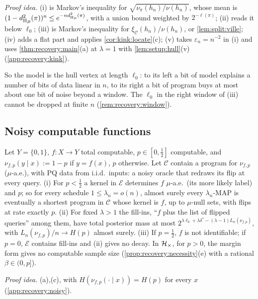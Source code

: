 \emph{Proof idea.} (i) is Markov's inequality for $\sqrt{\nu_\pi(h_n)/\nu(h_n)}$, whose mean is $(1-{d_{\mathrm{H}}^{2}}_\mu(\pi))^n\le e^{-n{d_{\mathrm{H}}^{2}}_\mu(\pi)}$, with a union bound weighted by $2^{-\ell(\pi)}$; (ii) reads it below $\ell_0$; (iii) is Markov's inequality for $\xi_{\mathcal C}(h_n)/\nu(h_n)$, or \cref{lem:split:ville}; (iv) adds a flat part and applies \cref{cor:kink:locate}(c); (v) takes $\varepsilon_n=n^{-2}$ in (i) and uses \cref{thm:recovery:main}(a) at $\lambda=1$ with \cref{lem:setup:hull}(v) (\cref{app:recovery:kink}).

So the model is the hull vertex at length $\ell_0$: to its left a bit of model explains a number of bits of data linear in $n$, to its right a bit of program buys at most about one bit of noise beyond a window. The $\ell_0$ in the right window of (iii) cannot be dropped at finite $n$ (\cref{rem:recovery:window}).

\subsection{Noisy computable functions}\label{sec:recovery:noisy}

\begin{corollary}\label{cor:recovery:noisy}
Let $Y=\{0,1\}$, $f:X\to Y$ total computable, $p\in[0,\frac12]$ computable, and $\nu_{f,p}(y\mid x):=1-p$ if $y=f(x)$, $p$ otherwise. Let $\mathcal C$ contain a program for $\nu_{f,p}$ ($\mu$-a.e.), with PQ data from i.i.d.\ inputs: a noisy oracle that redraws its flip at every query.
(i) For $p<\frac12$ a kernel in $\mathcal E$ determines $f$ $\mu$-a.e.\ (its more likely label) and $p$; so for every schedule $1\le\lambda_n=o(n)$, almost surely every $\lambda_n$-MAP is eventually a shortest program in $\mathcal C$ whose kernel is $f$, up to $\mu$-null sets, with flips at rate exactly $p$.
(ii) For fixed $\lambda>1$ the fill-ins, ``$f$ plus the list of flipped queries'' among them, have total posterior mass at most $2^{\lambda\ell_0+\lambda\delta^*-(\lambda-1)L_n(\nu_{f,p})}$, with $L_n(\nu_{f,p})/n\to H(p)$ almost surely.
(iii) If $p=\frac12$, $f$ is not identifiable; if $p=0$, $\mathcal E$ contains fill-ins and (ii) gives no decay. In $\mathcal{H}_{\times}$, for $p>0$, the margin form gives no computable sample size (\cref{prop:recovery:necessity}(e) with a rational $\beta\in(0,p]$).
\end{corollary}

\emph{Proof idea.} (a),(c), with $H(\nu_{f,p}(\cdot\mid x))=H(p)$ for every $x$ (\cref{app:recovery:noisy}).

